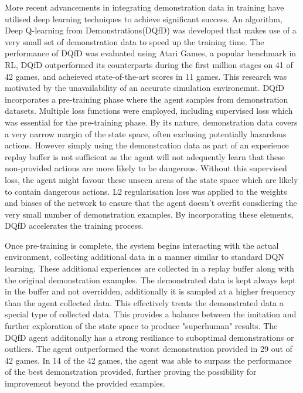 
More recent advancements in integrating demonstration data in training have utilised deep learning techniques to achieve significant success\cite{deepQLearningFromDemo}.
An algorithm, Deep Q-learning from Demonstrations(DQfD) was developed that makes use of a very small set of demonstration data to speed up the training time.
The performance of DQfD was evaluated using Atari Games, a popular benchmark in RL, DQfD outperformed its counterparts during the first million stages on 41 of 42 games, and acheieved state-of-the-art scores in 11 games.
This research was motivated by the unavailability of an accurate simulation environemnt.
DQfD incorporates a pre-training phase where the agent samples from demonstration datasets.
Multiple loss functions were employed, including supervised loss which was essential for the pre-training phase.
By its nature, demonstration data covers a very narrow margin of the state space, often exclusing potentially hazardous actions.
However simply using the demonstration data as part of an experience replay buffer is not sufficient as the agent will not adequently learn that these non-provided actions are more likely to be dangerous.
Without this supervised loss, the agent might favour these unseen areas of the state space which are likely to contain dangerous actions.
L2 regularisation loss was applied to the weights and biases of the network to ensure that the agent doesn't overfit consdiering the very small number of demonstration examples.
By incorporating these elements, DQfD accelerates the training process.

Once pre-training is complete, the system begins interacting with the actual environment, collecting additional data in a manner similar to standard DQN learning.
These additional experiences are collected in a replay buffer along with the original demonstration examples.
The demonstrated data is kept always kept in the buffer and not overridden, additionally it is sampled at a higher frequency than the agent collected data.
This effectively treats the demonstrated data a special type of collected data.
This provides a balance between the imitation and further exploration of the state space to produce "superhuman" results.
The DQfD agent additonally has a strong resiliance to suboptimal demonstrations or outliers.
The agent outperformed the worst demonstration provided in 29 out of 42 games.
In 14 of the 42 games, the agent was able to surpass the performance of the best demonstration provided, further proving the possibility for improvement beyond the provided examples.

